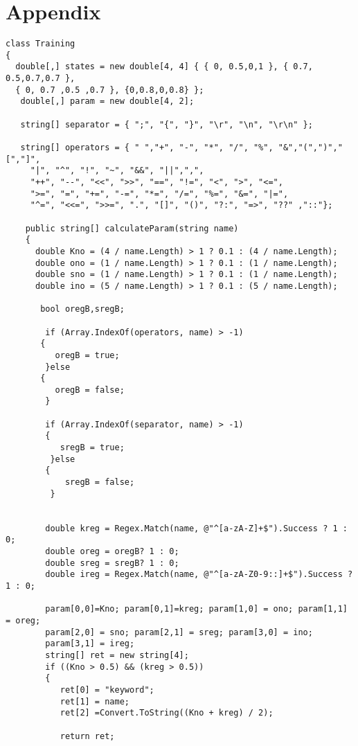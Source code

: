 \documentclass[23pt]{article}
\begin{document}
\newpage

\newpage

\section{Appendix}


\begin{lstlisting}[label=some-code,caption= Code for training the system]
class Training
{
  double[,] states = new double[4, 4] { { 0, 0.5,0,1 }, { 0.7, 0.5,0.7,0.7 },
  { 0, 0.7 ,0.5 ,0.7 }, {0,0.8,0,0.8} };
   double[,] param = new double[4, 2];

   string[] separator = { ";", "{", "}", "\r", "\n", "\r\n" };

   string[] operators = { " ","+", "-", "*", "/", "%", "&","(",")","[","]",
     "|", "^", "!", "~", "&&", "||",",",
     "++", "--", "<<", ">>", "==", "!=", "<", ">", "<=",
     ">=", "=", "+=", "-=", "*=", "/=", "%=", "&=", "|=",
     "^=", "<<=", ">>=", ".", "[]", "()", "?:", "=>", "??" ,"::"};

    public string[] calculateParam(string name)
    {
      double Kno = (4 / name.Length) > 1 ? 0.1 : (4 / name.Length);
      double ono = (1 / name.Length) > 1 ? 0.1 : (1 / name.Length);
      double sno = (1 / name.Length) > 1 ? 0.1 : (1 / name.Length);
      double ino = (5 / name.Length) > 1 ? 0.1 : (5 / name.Length);

       bool oregB,sregB;

        if (Array.IndexOf(operators, name) > -1) 
       {
          oregB = true; 
        }else
       {
          oregB = false;
        }

        if (Array.IndexOf(separator, name) > -1) 
        {
           sregB = true; 
         }else
        {
            sregB = false;
         }


        double kreg = Regex.Match(name, @"^[a-zA-Z]+$").Success ? 1 : 0;
        double oreg = oregB? 1 : 0;
        double sreg = sregB? 1 : 0; 
        double ireg = Regex.Match(name, @"^[a-zA-Z0-9::]+$").Success ? 1 : 0;

        param[0,0]=Kno; param[0,1]=kreg; param[1,0] = ono; param[1,1] = oreg;  
        param[2,0] = sno; param[2,1] = sreg; param[3,0] = ino;
        param[3,1] = ireg;
        string[] ret = new string[4];
        if ((Kno > 0.5) && (kreg > 0.5))
        {
           ret[0] = "keyword";
           ret[1] = name;
           ret[2] =Convert.ToString((Kno + kreg) / 2);

           return ret;
                

\end{lstlisting}
\end{document}
